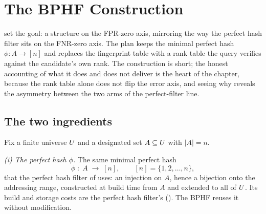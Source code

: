 %

\section{The BPHF Construction}
\label{sec:bphf-construction}

 set the goal: a structure on the FPR-zero axis,
mirroring the way the perfect hash filter sits on the FNR-zero axis.
The plan keeps the minimal perfect hash $\phi : A \to [n]$ and replaces
the fingerprint table with a rank table the query verifies against the
candidate's own rank. The construction is short; the honest accounting
of what it does and does not deliver is the heart of the chapter,
because the rank table alone does not flip the error axis, and seeing
why reveals the asymmetry between the two arms of the perfect-filter
line.

\subsection*{The two ingredients}

Fix a finite universe $U$ and a designated set $A \subseteq
U$ with $|A| = n$.

\smallskip
\noindent\emph{(i) The perfect hash $\phi$.} The same minimal perfect hash
\[
  \phi \;:\; A \;\longrightarrow\; [n], \qquad [n] = \{1, 2, \ldots, n\},
\]
that the perfect hash filter of  uses: an injection on $A$,
hence a bijection onto the addressing range, constructed at build time
from $A$ and extended to all of $U$. Its build and storage costs
are the perfect hash filter's (). The BPHF
reuses it without modification.


